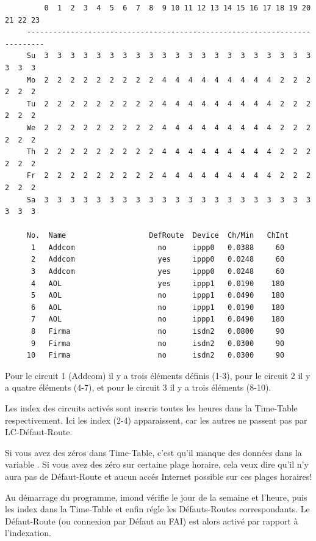 \begin{example}
\begin{verbatim}
         0  1  2  3  4  5  6  7  8  9 10 11 12 13 14 15 16 17 18 19 20 21 22 23
     --------------------------------------------------------------------------
     Su  3  3  3  3  3  3  3  3  3  3  3  3  3  3  3  3  3  3  3  3  3  3  3  3
     Mo  2  2  2  2  2  2  2  2  2  4  4  4  4  4  4  4  4  4  2  2  2  2  2  2
     Tu  2  2  2  2  2  2  2  2  2  4  4  4  4  4  4  4  4  4  2  2  2  2  2  2
     We  2  2  2  2  2  2  2  2  2  4  4  4  4  4  4  4  4  4  2  2  2  2  2  2
     Th  2  2  2  2  2  2  2  2  2  4  4  4  4  4  4  4  4  4  2  2  2  2  2  2
     Fr  2  2  2  2  2  2  2  2  2  4  4  4  4  4  4  4  4  4  2  2  2  2  2  2
     Sa  3  3  3  3  3  3  3  3  3  3  3  3  3  3  3  3  3  3  3  3  3  3  3  3

     No.  Name                   DefRoute  Device  Ch/Min   ChInt
      1   Addcom                   no      ippp0   0.0388     60
      2   Addcom                   yes     ippp0   0.0248     60
      3   Addcom                   yes     ippp0   0.0248     60
      4   AOL                      yes     ippp1   0.0190    180
      5   AOL                      no      ippp1   0.0490    180
      6   AOL                      no      ippp1   0.0190    180
      7   AOL                      no      ippp1   0.0490    180
      8   Firma                    no      isdn2   0.0800     90
      9   Firma                    no      isdn2   0.0300     90
     10   Firma                    no      isdn2   0.0300     90
\end{verbatim}
\end{example}

  Pour le circuit 1 (Addcom) il y a trois éléments définis (1-3),
  pour le circuit 2 il y a quatre éléments (4-7), et pour le circuit 3
  il y a trois éléments (8-10).

  Les index des circuits activés sont inscris toutes les heures dans
  la Time-Table respectivement. Ici les index (2-4) apparaissent,
  car les autres ne passent pas par LC-Défaut-Route.

  Si vous avez des zéros dans Time-Table, c'est qu'il manque des données
  dans la variable . Si vous avez des
  zéro sur certaine plage horaire, cela veux dire qu'il n'y aura pas de
  Défaut-Route et aucun accés Internet possible sur ces plages horaires!

  Au démarrage du programme, imond vérifie le jour de la semaine et
  l'heure, puis les index dans la Time-Table et enfin régle les Défauts-Routes
  correspondants. Le Défaut-Route (ou connexion par Défaut au FAI) est alors
  activé par rapport à l'indexation.

